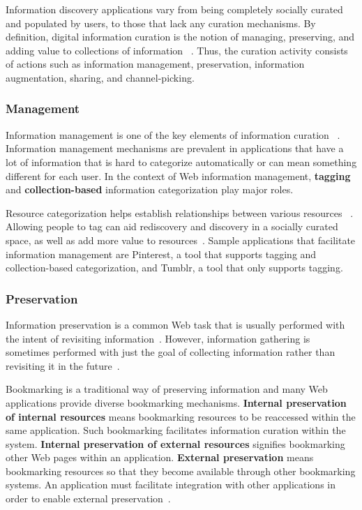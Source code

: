 {{Information discovery applications vary from being completely socially curated and populated by users, to those that lack any curation mechanisms. 
By definition, digital information curation is the notion of managing, preserving, and adding value to collections of information ~\cite{beagrie2008digital,whittaker2011personal}. Thus, the curation activity consists of actions such as information management, preservation, information augmentation, sharing, and channel-picking.

{\subsubsection{Management}
Information management is one of the key elements of information curation ~\cite{beagrie2008digital,whittaker2011personal}. Information management mechanisms are prevalent in applications that have a lot of information that is hard to categorize automatically or can mean something different for each user. In the context of Web information management, \textbf{tagging} and \textbf{collection-based} information categorization play major roles.

Resource categorization helps establish relationships between various resources ~\cite{beagrie2008digital,whittaker2011personal}. Allowing people to tag can aid rediscovery and discovery in a socially curated space, as well as add more value to resources~\cite{gruber2007ontology}. Sample applications that facilitate information management are Pinterest, a tool that supports tagging and collection-based categorization, and Tumblr, a tool that only supports tagging.
} %

{\subsubsection{Preservation}
Information preservation is a common Web task that is usually performed with the intent of revisiting information~\cite{abrams1998information,whittaker2011personal}. However, information gathering is sometimes performed with just the goal of collecting information rather than revisiting it in the future~\cite{lindley2012s}. 

Bookmarking is a traditional way of preserving information and many Web applications provide diverse bookmarking mechanisms. \textbf{Internal preservation of internal resources} means bookmarking resources to be reaccessed within the same application. Such bookmarking facilitates information curation within the system. \textbf{Internal preservation of external resources} signifies bookmarking other Web pages within an application. \textbf{External preservation} means bookmarking resources so that they become available through other bookmarking systems. An application must facilitate integration with other applications in order to enable external preservation~\cite{abrams1998information}.

}}}
